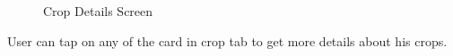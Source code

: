 \documentclass[../Report.tex]{subfiles}
\begin{document}
\begin{figure}[H]%
    \centering
    \qquad
    \caption{Crop Details Screen}
    \label{fig:ss_crop_details}%
\end{figure}

User can tap on any of the card in crop tab to get more details about his crops.
\end{document}
